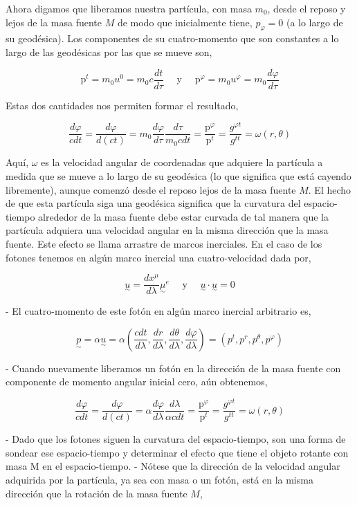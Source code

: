 Ahora digamos que liberamos nuestra partícula, con masa $m_0$, desde el reposo y lejos de la masa fuente $M$ de modo que inicialmente tiene, $p_{\varphi}=0$ (a lo largo de su geodésica). Los componentes de su cuatro-momento que son constantes a lo largo de las geodésicas por las que se mueve son,

$$
    \mathrm{p}^t=m_0 u^0=m_0 c \frac{d t}{d \tau} \quad \text { y } \quad \mathrm{p}^{\varphi}=m_0 u^{\varphi}=m_0 \frac{d \varphi}{d \tau}
$$

Estas dos cantidades nos permiten formar el resultado,

$$
    \frac{d \varphi}{c d t}=\frac{d \varphi}{d(c t)}=m_0 \frac{d \varphi}{d \tau} \frac{d \tau}{m_0 c d t}=\frac{\mathrm{p}^{\varphi}}{\mathrm{p}^t}=\frac{g^{\varphi t}}{g^{t t}}=\omega(r, \theta)
$$

Aquí, $\omega$ es la velocidad angular de coordenadas que adquiere la partícula a medida que se mueve a lo largo de su geodésica (lo que significa que está cayendo libremente), aunque comenzó desde el reposo lejos de la masa fuente $M$.
El hecho de que esta partícula siga una geodésica significa que la curvatura del espacio-tiempo alrededor de la masa fuente debe estar curvada de tal manera que la partícula adquiera una velocidad angular en la misma dirección que la masa fuente.
Este efecto se llama arrastre de marcos inerciales.
En el caso de los fotones tenemos en algún marco inercial una cuatro-velocidad dada por,

$$
    \underset{\sim}{u}=\frac{d x^\mu}{d \lambda}{\underset{\sim}{\mu}}^e \quad \text { y } \quad \underset{\sim}{u} \cdot \underset{\sim}{u}=0
$$

- El cuatro-momento de este fotón en algún marco inercial arbitrario es,

$$
    \underset{\sim}{p}=\alpha \underset{\sim}{u}=\alpha\left(\frac{c d t}{d \lambda}, \frac{d r}{d \lambda}, \frac{d \theta}{d \lambda}, \frac{d \varphi}{d \lambda}\right)=\left(p^t, p^r, p^\theta, p^{\varphi}\right)
$$

- Cuando nuevamente liberamos un fotón en la dirección de la masa fuente con componente de momento angular inicial cero, aún obtenemos,

$$
    \frac{d \varphi}{c d t}=\frac{d \varphi}{d(c t)}=\alpha \frac{d \varphi}{d \lambda} \frac{d \lambda}{\alpha c d t}=\frac{\mathrm{p}^{\varphi}}{\mathrm{p}^t}=\frac{g^{\varphi t}}{g^{t t}}=\omega(r, \theta)
$$

- Dado que los fotones siguen la curvatura del espacio-tiempo, son una forma de sondear ese espacio-tiempo y determinar el efecto que tiene el objeto rotante con masa M en el espacio-tiempo.
- Nótese que la dirección de la velocidad angular adquirida por la partícula, ya sea con masa o un fotón, está en la misma dirección que la rotación de la masa fuente $M$,

